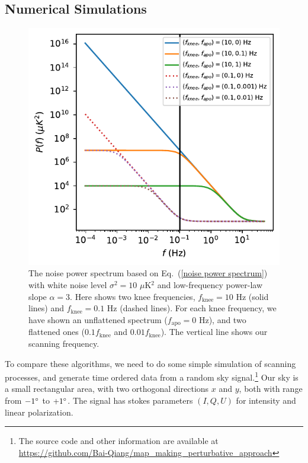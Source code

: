 \documentclass[twocolumn,linenumbers]{aastex631}
\begin{document}
\subsection{Numerical Simulations}

\begin{figure}[tb!]
\includegraphics[width=\linewidth]{P_f.pdf}
\centering
\caption{The noise power spectrum based on Eq.~(\ref{noise power spectrum}) with 
    white noise level $\sigma^2 = 10$ $\mu$K$^2$ and low-frequency power-law slope $\alpha = 3$.
    Here shows two knee frequencies, $f_\text{knee}=10$ Hz (solid lines) 
    and $f_\text{knee}=0.1$ Hz (dashed lines).
    For each knee frequency, we have shown an unflattened spectrum ($f_\text{apo}=0$ Hz), and two flattened ones ($0.1f_\text{knee}$ and
    $0.01f_\text{knee}$).
    The vertical line shows our scanning frequency.
}
\label{power spectrum}
\end{figure}

To compare these algorithms, we need to do some simple simulation of scanning
processes, and generate time ordered data from a random sky signal.\footnote{
The source code and other information are available at \url{https://github.com/Bai-Qiang/map_making_perturbative_approach}
}
Our sky is a small rectangular area, with two orthogonal directions $x$ and
$y$, both with range from $-1\degree$ to $+1\degree$.
The signal has stokes parameters $(I,Q,U)$ for intensity and linear polarization.
\end{document}
